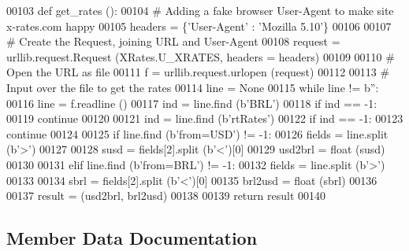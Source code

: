 \begin{DoxyCode}
00103     \textcolor{keyword}{def }get\_rates ():        
00104         \textcolor{comment}{# Adding a fake browser User-Agent to make site x-rates.com happy}
00105         headers = \{\textcolor{stringliteral}{'User-Agent'} : \textcolor{stringliteral}{'Mozilla 5.10'}\}
00106             
00107         \textcolor{comment}{# Create the Request, joining URL and User-Agent}
00108         request = urllib.request.Request (XRates.U\_XRATES, headers = headers)
00109     
00110         \textcolor{comment}{# Open the URL as file}
00111         f = urllib.request.urlopen (request)
00112         
00113         \textcolor{comment}{# Input over the file to get the rates}
00114         line = \textcolor{keywordtype}{None}
00115         \textcolor{keywordflow}{while} line != b\textcolor{stringliteral}{''}:
00116             line = f.readline ()
00117             ind = line.find (b\textcolor{stringliteral}{'BRL'})
00118             \textcolor{keywordflow}{if} ind == -1:
00119                 \textcolor{keywordflow}{continue} 
00120             
00121             ind = line.find (b\textcolor{stringliteral}{'rtRates'})
00122             \textcolor{keywordflow}{if} ind == -1:
00123                 \textcolor{keywordflow}{continue} 
00124                     
00125             \textcolor{keywordflow}{if} line.find (b\textcolor{stringliteral}{'from=USD'}) != -1:
00126                 fields = line.split (b\textcolor{stringliteral}{'>'})
00127                 
00128                 susd = fields[2].split (b\textcolor{stringliteral}{'<'})[0]
00129                 usd2brl = float (susd)
00130             
00131             \textcolor{keywordflow}{elif} line.find (b\textcolor{stringliteral}{'from=BRL'}) != -1:
00132                 fields = line.split (b\textcolor{stringliteral}{'>'})
00133                 
00134                 sbrl = fields[2].split (b\textcolor{stringliteral}{'<'})[0]
00135                 brl2usd = float (sbrl)
00136                 
00137         result = (usd2brl, brl2usd)
00138         
00139         \textcolor{keywordflow}{return} result
00140 
\end{DoxyCode}


\subsection{Member Data Documentation}
\mbox{\label{classrates_1_1_x_rates_acb0a8b6ec059b823c8a46eb115341251}} 
